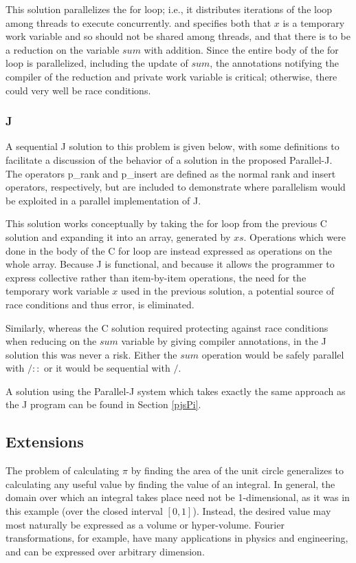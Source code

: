 This solution parallelizes the for loop; 
i.e., it distributes iterations of the loop among threads to execute concurrently.
and specifies both that $x$ is a temporary work variable and so should not be shared among threads, 
and that there is to be a reduction on the variable $sum$ with addition. 
Since the entire body of the for loop is parallelized, including the update of $sum$, 
the annotations notifying the compiler of the reduction and private work variable is critical; 
otherwise, there could very well be race conditions.

\subsubsection{J}
A sequential J solution to this problem is given below, 
with some definitions to facilitate a discussion 
of the behavior of a solution in the proposed Parallel-J. 
The operators \ttfamily p\_rank \normalfont and \ttfamily p\_insert \normalfont 
are defined as the normal rank and insert operators, respectively,  
but are included to demonstrate where parallelism would be exploited in a parallel implementation of J.

\begin{singlespacing}
\begin{small}

\end{small}
\end{singlespacing}

This solution works conceptually by taking the for loop from the previous C solution 
and expanding it into an array, generated by $xs$.
Operations which were done in the body of the C for loop 
are instead expressed as operations on the whole array. 
Because J is functional, and 
because it allows the programmer to express collective rather than item-by-item operations, 
the need for the temporary work variable $x$ used in the previous solution, 
a potential source of race conditions and thus error, is eliminated. 

Similarly, whereas the C solution required 
protecting against race conditions when reducing on the $sum$ variable
by giving compiler annotations, 
in the J solution this was never a risk.
Either the $sum$ operation would be safely parallel with $/::$ or 
it would be sequential with $/$.

A solution using the Parallel-J system which takes exactly the same approach as the J program 
can be found in Section \ref{pjsPi}.

\subsection{Extensions}
\label{piext}
The problem of calculating $\pi$ by finding the area of the unit circle 
generalizes to calculating any useful value by finding the value of an integral. 
In general, the domain over which an integral takes place need not be 1-dimensional, 
as it was in this example (over the closed interval $[0,1]$).
Instead, the desired value may most naturally be expressed as a volume or hyper-volume. 
Fourier transformations, for example, have many applications in physics and engineering, 
and can be expressed over arbitrary dimension.

